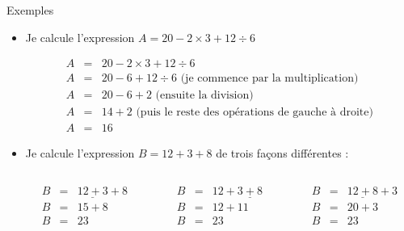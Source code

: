 \documentclass[xcolor={dvipsnames}]{beamer}
\newcommand{\myitem}{\item[\textbullet]}
\begin{document}
\begin{frame}
	\begin{exampleblock}{Exemples}
		\begin{itemize}
			\myitem Je calcule l'expression $A= 20 - 2 \times 3 + 12 \div 6$
			
			\vspace*{-0.5cm}
			
			\begin{eqnarray*}
				A &=& 20 - 2 \times 3 + 12 \div 6 \\
				A &=& 20 - 6 + 12 \div 6 \text{ (je commence par la multiplication) }\\
				A &=& 20 - 6 + 2 \text{ (ensuite la division)} \\
				A &=& 14 + 2 \text{ (puis le reste des opérations de gauche à droite)}\\
				A &=& 16
			\end{eqnarray*}
			
			\myitem Je calcule l'expression $B= 12 + 3 +8$ de trois façons différentes :
			
			\vspace*{-0.5cm}
			\begin{columns}
				\begin{column}{0.33\textwidth}
					\begin{eqnarray*}
						B &=& \underline{12 + 3} + 8 \\
						B &=& 15 + 8 \\
						B &=& 23
					\end{eqnarray*}
				\end{column}
				
				\begin{column}{0.33\textwidth}
					\begin{eqnarray*}
						B &=& 12 + \underline{3 + 8} \\
						B &=& 12 + 11 \\
						B &=& 23
					\end{eqnarray*}
				\end{column}
				
				
				\begin{column}{0.33\textwidth}
					\begin{eqnarray*}
						B &=& \underline{12 + 8} + 3 \\
						B &=& 20 + 3 \\
						B &=& 23
					\end{eqnarray*}	
				\end{column}
				
			\end{columns}
			
		\end{itemize}
	\end{exampleblock}
\end{frame}
\end{document}
